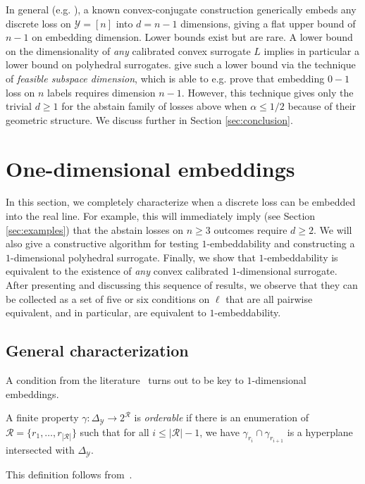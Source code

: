 \documentclass[anon]{colt2020} %
\newcommand{\simplex}{\Delta_\Y}
\newcommand{\R}{\mathcal{R}}
\newcommand{\Y}{\mathcal{Y}}
\begin{document}
In general (e.g. \cite{finocchiaro2019embedding}), a known convex-conjugate construction generically embeds any discrete loss on $\Y = [n]$ into $d = n-1$ dimensions, giving a flat upper bound of $n-1$ on embedding dimension.
Lower bounds exist but are rare.
A lower bound on the dimensionality of \emph{any} calibrated convex surrogate $L$ implies in particular a lower bound on polyhedral surrogates.
\cite{ramaswamy2016convex} give such a lower bound via the technique of \emph{feasible subspace dimension}, which is able to e.g. prove that embedding $0-1$ loss on $n$ labels requires dimension $n-1$.
However, this technique gives only the trivial $d \geq 1$ for the abstain family of losses above when $\alpha \leq 1/2$ because of their geometric structure.
We discuss further in Section \ref{sec:conclusion}.


\section{One-dimensional embeddings}
\label{sec:1d}

In this section, we completely characterize when a discrete loss can be embedded into the real line.
For example, this will immediately imply (see Section \ref{sec:examples}) that the abstain losses on $n \geq 3$ outcomes require $d \geq 2$.
We will also give a constructive algorithm for testing $1$-embeddability and constructing a $1$-dimensional polyhedral surrogate.
Finally, we show that $1$-embeddability is equivalent to the existence of \emph{any} convex calibrated $1$-dimensional surrogate.
After presenting and discussing this sequence of results, we observe that they can be collected as a set of five or six conditions on $\ell$ that are all pairwise equivalent, and in particular, are equivalent to $1$-embeddability.

\subsection{General characterization}

A condition from the literature~\citep{lambert2018elicitation} turns out to be key to $1$-dimensional embeddings.
\begin{definition}[Orderable]\label{def:orderable-hyperplane}
	A finite property $\gamma:\simplex \to 2^\R$ is \emph{orderable} if there is an enumeration of $\R = \{r_1, \ldots, r_{|\R|}\}$ such that for all $i \leq |\R| - 1$, we have $\gamma_{r_i} \cap \gamma_{r_{i+1}}$ is a hyperplane intersected with $\simplex$.
\end{definition}
This definition follows from~\cite[Theorem 3]{lambert2018elicitation}.
\end{document}
